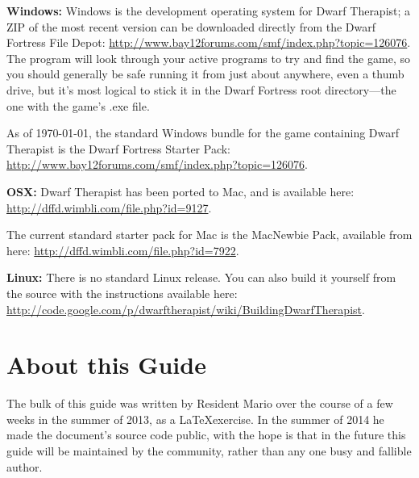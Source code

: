 \documentclass[]{article}
\begin{document}
\indent\textbf{Windows:} Windows is the development operating system for Dwarf Therapist; a ZIP of the
most recent version can be downloaded directly from the Dwarf Fortress File Depot: 
\url{http://www.bay12forums.com/smf/index.php?topic=126076}. The program will look through your
active programs to try and find the game, so you should generally be safe running it from just about
anywhere, even a thumb drive, but it's most logical to stick it in the Dwarf Fortress root
directory---the one with the game's .exe file.

As of \today, the standard Windows bundle for the game containing Dwarf Therapist is the Dwarf Fortress
Starter Pack: \url{http://www.bay12forums.com/smf/index.php?topic=126076}.

\vspace{12pt}

\textbf{OSX:}
Dwarf Therapist has been ported to Mac, and is available here:
\url{http://dffd.wimbli.com/file.php?id=9127}.

The current standard starter pack for Mac is the MacNewbie Pack, available from here:
\url{http://dffd.wimbli.com/file.php?id=7922}.
\vspace{12pt}

\textbf{Linux:}
There is no standard Linux release. You can also build it yourself from the source with the instructions
available here: \url{http://code.google.com/p/dwarftherapist/wiki/BuildingDwarfTherapist}.

\section{About this Guide}
\label{sec:About this Guide}

The bulk of this guide was written by Resident Mario over the course of a few weeks in the summer of
2013, as a \LaTeX \space exercise. In the summer of 2014 he made the document's source code public,
with the hope is that in the future this guide will be maintained by the community, rather than any one
busy and fallible author.
\end{document}
